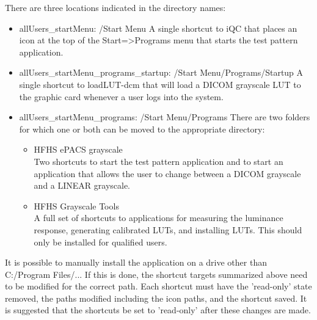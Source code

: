 There are three locations indicated in the directory names: 

\begin{itemize}
\item \textnormal{allUsers\_startMenu}: \textnormal{/Start Menu} A single shortcut to iQC that places an icon at the top of the Start=>Programs menu that starts the test pattern application. 

\item \textnormal{allUsers\_startMenu\_programs\_startup}: \textnormal{/Start Menu/Programs/Startup} A single shortcut to loadLUT-dcm that will load a DICOM grayscale LUT to the graphic card whenever a user logs into the system. 

\item \textnormal{allUsers\_startMenu\_programs}: \textnormal{/Start Menu/Programs} There are two folders for which one or both can be moved to the appropriate directory: 

\begin{itemize}
\item HFHS ePACS grayscale\\
Two shortcuts to start the test pattern application and to start an application that allows the user to change between a DICOM grayscale and a LINEAR grayscale. 

\item HFHS Grayscale Tools\\
A full set of shortcuts to applications for measuring the luminance response, generating calibrated LUTs, and installing LUTs. This should only be installed for qualified users. 
\end{itemize}
\end{itemize}

It is possible to manually install the application on a drive other than \textnormal{C:/Program Files/...} If this is done, the shortcut targets summarized above need to be modified for the correct path. Each shortcut must have the 'read-only' state removed, the paths modified including the icon paths, and the shortcut saved. It is suggested that the shortcuts be set to 'read-only' after these changes are made. 

%